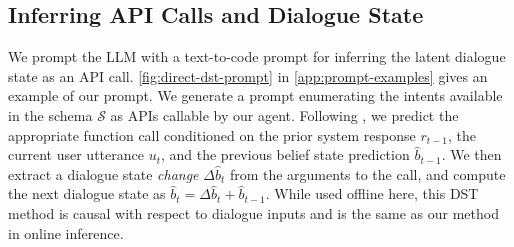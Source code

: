 \documentclass[11pt]{article}
\newcommand{\schema}[0]{\mathcal{S}}
\newcommand{\dstcolor}[1]{\textcolor{dst-color}{#1}}
\begin{document}

\subsection{Inferring API Calls and Dialogue State}
\label{sec:methods-dst}

We prompt the LLM with a text-to-code prompt for inferring the latent dialogue state as an API call.
\autoref{fig:direct-dst-prompt}  in \autoref{app:prompt-examples} gives an example of our prompt.
We generate a prompt enumerating the intents available in the schema $\schema$ as APIs callable by our agent.
Following \citet{hu_-context_2022}, we predict the appropriate function call conditioned on the prior system response $r_{t-1}$, the current user utterance $u_t$, and the previous belief state prediction $\hat{b}_{t-1}$. 
We then extract a dialogue state \textit{change} $\Delta \hat{b}_t$ from the arguments to the call, and compute the next dialogue state as $\hat{b}_t = \Delta \hat{b}_t + \hat{b}_{t-1}$.
While used offline here, this DST method is causal with respect to dialogue inputs and is the same as our method in online inference.
\end{document}
